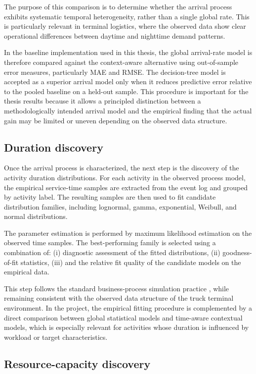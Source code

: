 The purpose of this comparison is to determine whether the arrival process exhibits systematic temporal heterogeneity, rather than a single global rate.
This is particularly relevant in terminal logistics, where the observed data show clear operational differences between daytime and nighttime demand patterns.

In the baseline implementation used in this thesis, the global arrival-rate model is therefore compared against the context-aware alternative using out-of-sample error measures, particularly MAE and RMSE.
The decision-tree model is accepted as a superior arrival model only when it reduces predictive error relative to the pooled baseline on a held-out sample.
This procedure is important for the thesis results because it allows a principled distinction between a
methodologically intended arrival model and the empirical finding that the actual gain may be limited or uneven depending on the observed data structure.

\subsection{Duration discovery}

Once the arrival process is characterized, the next step is the discovery of the activity duration distributions.
For each activity in the observed process model, the empirical service-time samples are extracted from the event log and grouped by activity label.
The resulting samples are then used to fit candidate distribution families, including lognormal, gamma, exponential, Weibull, and normal distributions.

The parameter estimation is performed by maximum likelihood estimation on the observed time samples.
The best-performing family is selected using a combination of:
(i) diagnostic assessment of the fitted distributions,
(ii) goodness-of-fit statistics,
(iii) and the relative fit quality of the candidate models on the empirical data.

This step follows the standard business-process simulation practice \cite{PMRozinat2009,Camargo2020}, while remaining consistent with the observed data structure of the truck terminal environment.
In the project, the empirical fitting procedure is complemented by a direct comparison between global statistical models and time-aware contextual models, which is especially relevant for activities whose duration is influenced by workload or target characteristics.

\subsection{Resource-capacity discovery}


